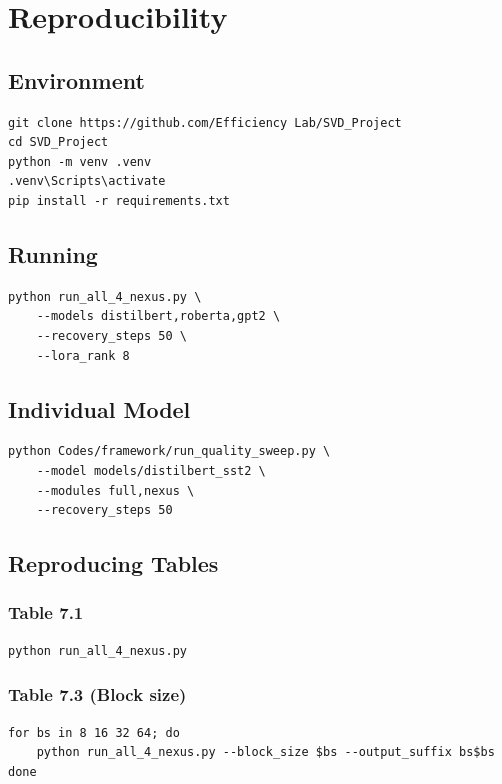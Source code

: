 \section{Reproducibility}

\subsection{Environment}

\begin{lstlisting}
git clone https://github.com/Efficiency Lab/SVD_Project
cd SVD_Project
python -m venv .venv
.venv\Scripts\activate
pip install -r requirements.txt
\end{lstlisting}

\subsection{Running}

\begin{lstlisting}
python run_all_4_nexus.py \
    --models distilbert,roberta,gpt2 \
    --recovery_steps 50 \
    --lora_rank 8
\end{lstlisting}

\subsection{Individual Model}

\begin{lstlisting}
python Codes/framework/run_quality_sweep.py \
    --model models/distilbert_sst2 \
    --modules full,nexus \
    --recovery_steps 50
\end{lstlisting}

\subsection{Reproducing Tables}

\subsubsection{Table 7.1}
\begin{lstlisting}
python run_all_4_nexus.py
\end{lstlisting}

\subsubsection{Table 7.3 (Block size)}
\begin{lstlisting}
for bs in 8 16 32 64; do
    python run_all_4_nexus.py --block_size $bs --output_suffix bs$bs
done
\end{lstlisting}

